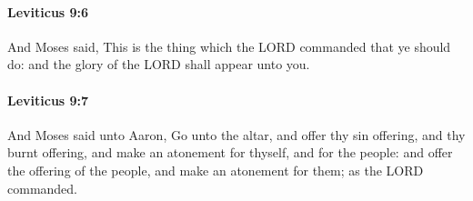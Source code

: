 		\paragraph{Leviticus 9:6} %
			\label{LEVITICUS-9-6}

			And Moses said, This is the thing which the LORD commanded that ye should do: and the glory of the LORD shall appear unto you.


		\paragraph{Leviticus 9:7} %
			\label{LEVITICUS-9-7}

			And Moses said unto Aaron, Go unto the altar, and offer thy sin offering, and thy burnt offering, and make an atonement for thyself, and for the people: and offer the offering of the people, and make an atonement for them; as the LORD commanded.

